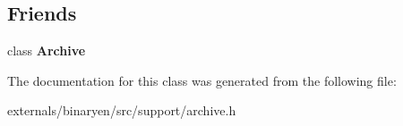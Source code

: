 \subsection*{Friends}
\begin{DoxyCompactItemize}
\item 
\mbox{\label{class_archive_1_1child__iterator_a4f1345bc28f2fd55b5ef2717d251ceea}} 
class {\bfseries Archive}
\end{DoxyCompactItemize}


The documentation for this class was generated from the following file\+:\begin{DoxyCompactItemize}
\item 
externals/binaryen/src/support/archive.\+h\end{DoxyCompactItemize}
